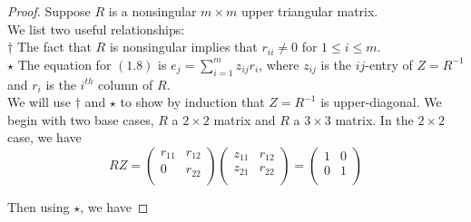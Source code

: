 \documentclass{article}
\begin{document}
    \begin{proof}
    Suppose $R$ is a nonsingular $m \times m$ upper triangular matrix.\\
    
    We list two useful relationships:\\

    $\dagger$ The fact that $R$ is nonsingular implies that $r_{ii} \neq 0$ for $1 \leq i \leq m$.\\

    $\star$ The equation for $(1.8)$ is $e_j = \sum_{i=1}^m z_{ij} r_i$, where $z_{ij}$ is the $ij$-entry of $Z=R^{-1}$ and $r_i$ is the $i^{th}$ column of $R$.\\

    We will use $\dagger$ and $\star$ to show by induction that $Z = R^{-1}$ is upper-diagonal. We begin with two base cases, $R$ a $2 \times 2$ matrix and $R$ a $3 \times 3$ matrix. In the $2 \times 2$ case, we have
    \[
        RZ = \begin{pmatrix}
            r_{11} & r_{12} \\
            0 & r_{22} \\
        \end{pmatrix} 
        \begin{pmatrix}
            z_{11} & r_{12} \\
            z_{21} & r_{22} \\
        \end{pmatrix} 
        =
        \begin{pmatrix}
            1 & 0 \\
            0 & 1 \\

        \end{pmatrix} 
    \]

    Then using $\star$, we have


\end{proof}
\end{document}
